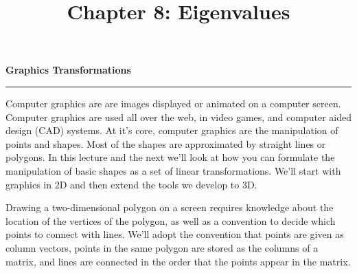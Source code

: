 \documentclass[12pt]{article}
\title{\LARGE\textbf{Chapter 8: Eigenvalues}\normalsize}
\date{}
\newcommand{\nin}{\noindent}
\newcommand{\vthree}{\vspace{3mm}}
\begin{document}

\let\thefootnote\relax{}



\vspace{-15mm}


\nin\Huge{\bf Graphics Transformations}\normalsize
\vspace{4mm}
\hrule

\vspace{5mm}

\nin Computer graphics are are images displayed or animated on a computer screen.  Computer graphics are used all over the web, in video games, and computer aided design (CAD) systems.  At it's core, computer graphics are the manipulation of points and shapes.  Most of the shapes are approximated by straight lines or polygons.  In this lecture and the next we'll look at how you can formulate the manipulation of basic shapes as a set of linear transformations.  We'll start with graphics in 2D and then extend the tools we develop to 3D.  %

\vthree

\nin Drawing a two-dimensional polygon on a screen requires knowledge about the location of the vertices of the polygon, as well as a convention to decide which points to connect with lines.  We'll adopt the convention that points are given as column vectors, points in the same polygon are stored as the columns of a matrix, and lines are connected in the order that the points appear in the matrix.

\vthree
\end{document}
